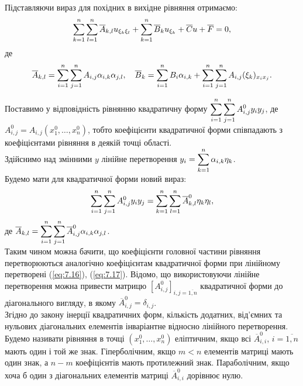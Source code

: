 Підставляючи вираз для похідних в вихідне рівняння отримаємо:
\begin{equation}
	\label{eq:7.15}
	\displaystyle\sum\limits_{k=1}^n \displaystyle\sum\limits_{l=1}^n \overline{A}_{k,l} u_{\xi_k\xi_l} + \displaystyle\sum\limits_{k=1}^n \overline{B}_k u_{\xi_k} + \overline{C} u + \overline{F} = 0,
\end{equation}
де
\begin{equation}
	\label{eq:7.16}
	\overline{A}_{k,l} = \displaystyle\sum\limits_{i=1}^n \displaystyle\sum\limits_{j=1}^n A_{i,j}\alpha_{i,k}\alpha_{j,l}, \quad \overline{B}_k = \displaystyle\sum\limits_{i=1}^n B_i \alpha_{i,k} + \displaystyle\sum\limits_{i=1}^n \displaystyle\sum\limits_{j=1}^n A_{i,j}(\xi_k)_{x_ix_j}.
\end{equation}

Поставимо у відповідність рівнянню квадратичну форму $\displaystyle\sum\limits_{i=1}^n \displaystyle\sum\limits_{j=1}^n A_{i,j}^0 y_iy_j$, де $A_{i,j}^0=A_{i,j}(x_1^0,\ldots,x_n^0)$, тобто коефіцієнти квадратичної форми співпадають з коефіцієнтами рівняння в деякій точці області. \\

Здійснимо над змінними $y$ лінійне перетворення $y_i = \displaystyle\sum\limits_{k=1}^n \alpha_{i,k} \eta_k$. \\

Будемо мати для квадратичної форми новий вираз:
\begin{equation}
	\label{eq:7.17}
	\displaystyle\sum\limits_{i=1}^n \displaystyle\sum\limits_{j=1}^n A_{i,j}^0 y_iy_j = \displaystyle\sum\limits_{k=1}^n\displaystyle\sum\limits_{l=1}^n \overline{A}_{k,l}^0 \eta_k \eta_l,
\end{equation}
де $\overline{A}_{k,l} = \displaystyle\sum\limits_{i=1}^n \displaystyle\sum\limits_{j=1}^n \overline{A}_{i,j}^0 \alpha_{i,k}\alpha_{j,l}$. \\

Таким чином можна бачити, що коефіцієнти головної частини рівняння перетворюються аналогічно коефіцієнтам квадратичної форми при лінійному перетворені (\ref{eq:7.16}), (\ref{eq:7.17}). Відомо, що використовуючи лінійне перетворення можна привести матрицю $\left[A_{i,j}^0\right]_{i,j=\overline{1,n}}$ квадратичної форми до діагонального вигляду, в якому $\overline{A}_{i,j}^0 = \delta_{i,j}$. \\

Згідно до закону інерції квадратичних форм, кількість додатних, від’ємних та нульових діагональних елементів інваріантне відносно лінійного перетворення. \\

Будемо називати рівняння в точці $(x_1^0,\ldots,x_n^0)$ еліптичним, якщо всі $\overline{A}_{i,i}^0$, $i=\overline{1,n}$ мають один і той же знак. Гіперболічним, якщо $m < n$ елементів матриці мають один знак, а $n - m$ коефіцієнтів мають протилежний знак. Параболічним, якщо хоча б один з діагональних елементів матриці $\overline{A}_{i,i}^0$ дорівнює нулю. \\

